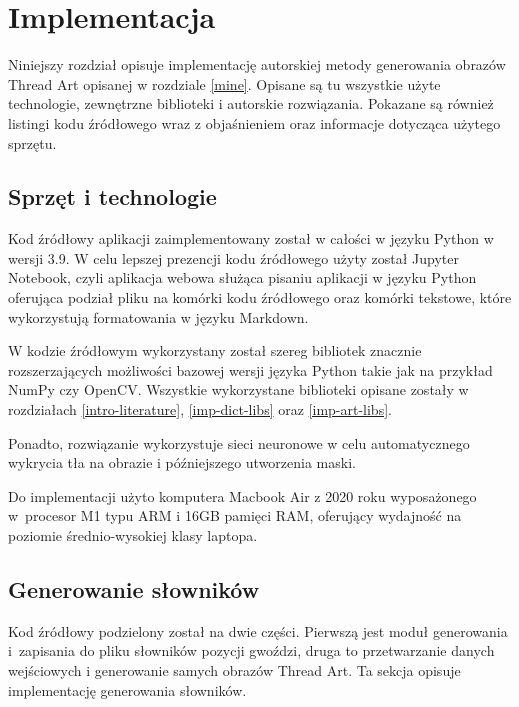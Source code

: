\chapter{Implementacja} \label{imp}
Niniejszy rozdział opisuje implementację autorskiej metody generowania obrazów Thread Art opisanej w rozdziale \ref{mine}. Opisane są tu wszystkie użyte technologie, zewnętrzne biblioteki i autorskie rozwiązania. Pokazane są również listingi kodu źródłowego wraz z objaśnieniem oraz informacje dotycząca użytego sprzętu.
    \section{Sprzęt i technologie} \label{imp-technologies}
    Kod źródłowy aplikacji zaimplementowany został w całości w języku Python w wersji 3.9. W celu lepszej prezencji kodu źródłowego użyty został Jupyter Notebook, czyli aplikacja webowa służąca pisaniu aplikacji w języku Python oferująca podział pliku na komórki kodu źródłowego oraz komórki tekstowe, które wykorzystują formatowania w języku Markdown.
    
    W kodzie źródłowym wykorzystany został szereg bibliotek znacznie rozszerzających możliwości bazowej wersji języka Python takie jak na przykład NumPy czy OpenCV. Wszystkie wykorzystane biblioteki opisane zostały w rozdziałach \ref{intro-literature}, \ref{imp-dict-libs} oraz \ref{imp-art-libs}.
    
    Ponadto, rozwiązanie wykorzystuje sieci neuronowe w celu automatycznego wykrycia tła na obrazie i późniejszego utworzenia maski.
    
    Do implementacji użyto komputera Macbook Air z 2020 roku wyposażonego w~procesor M1 typu ARM i 16GB pamięci RAM, oferujący wydajność na poziomie średnio-wysokiej klasy laptopa.
    
    \section{Generowanie słowników} \label{imp-dict}
    Kod źródłowy podzielony został na dwie części. Pierwszą jest moduł generowania i~zapisania do pliku słowników pozycji gwoździ, druga to przetwarzanie danych wejściowych i generowanie samych obrazów Thread Art. Ta sekcja opisuje implementację generowania słowników.
    
